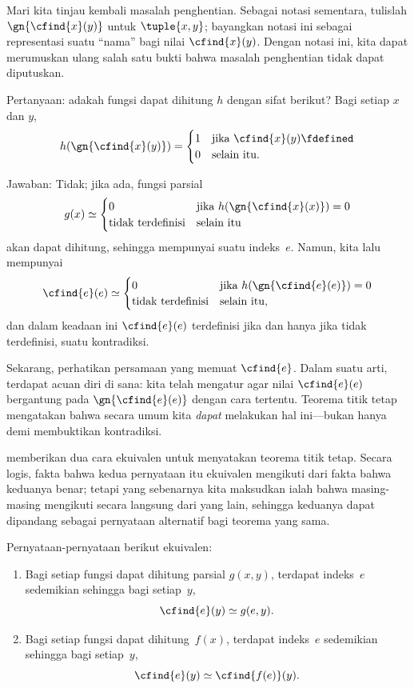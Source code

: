 \documentclass[../../../include/open-logic-section]{subfiles}
\begin{document}

Mari kita tinjau kembali masalah penghentian. Sebagai notasi sementara,
tulislah $\gn{\cfind{x}(y)}$ untuk $\tuple{x,y}$; bayangkan notasi ini sebagai
representasi suatu ``nama'' bagi nilai $\cfind{x}(y)$. Dengan notasi ini,
kita dapat merumuskan ulang salah satu bukti bahwa masalah penghentian tidak
dapat diputuskan.

Pertanyaan: adakah fungsi dapat dihitung $h$ dengan sifat berikut? Bagi setiap
$x$ dan $y$,
\[
h(\gn{\cfind{x}(y)}) =
\begin{cases}
1 & \text{jika $\cfind{x}(y) \fdefined$} \\
0 & \text{selain itu.}
\end{cases}
\]

Jawaban: Tidak; jika ada, fungsi parsial
\[
g(x) \simeq
\begin{cases}
0 & \text{jika $h(\gn{\cfind{x}(x)}) = 0$} \\
\text{tidak terdefinisi} & \text{selain itu}
\end{cases}
\]
akan dapat dihitung, sehingga mempunyai suatu indeks~$e$. Namun, kita lalu
mempunyai
\[
\cfind{e}(e) \simeq
\begin{cases}
0 & \text{jika $h(\gn{\cfind{e}(e)}) = 0$} \\
\text{tidak terdefinisi} & \text{selain itu,}
\end{cases}
\]
dan dalam keadaan ini $\cfind{e}(e)$ terdefinisi jika dan hanya jika tidak
terdefinisi, suatu kontradiksi.

Sekarang, perhatikan persamaan yang memuat $\cfind{e}$. Dalam suatu arti,
terdapat acuan diri di sana: kita telah mengatur agar nilai
$\cfind{e}(e)$ bergantung pada $\gn{\cfind{e}(e)}$ dengan cara tertentu.
Teorema titik tetap mengatakan bahwa secara umum kita \emph{dapat} melakukan
hal ini---bukan hanya demi membuktikan kontradiksi.

 memberikan dua cara ekuivalen untuk menyatakan teorema
titik tetap. Secara logis, fakta bahwa kedua pernyataan itu ekuivalen
mengikuti dari fakta bahwa keduanya benar; tetapi yang sebenarnya kita
maksudkan ialah bahwa masing-masing mengikuti secara langsung dari yang lain,
sehingga keduanya dapat dipandang sebagai pernyataan alternatif bagi teorema
yang sama.

\begin{lem}
Pernyataan-pernyataan berikut ekuivalen:
\begin{enumerate}
\item Bagi setiap fungsi dapat dihitung parsial $g(x,y)$, terdapat indeks~$e$
  sedemikian sehingga bagi setiap~$y$,
\[
\cfind{e}(y) \simeq g(e,y).
\]
\item Bagi setiap fungsi dapat dihitung~$f(x)$, terdapat indeks~$e$ sedemikian
  sehingga bagi setiap~$y$,
\[
\cfind{e}(y) \simeq \cfind{f(e)}(y).
\]
\end{enumerate}
\end{lem}
\end{document}
